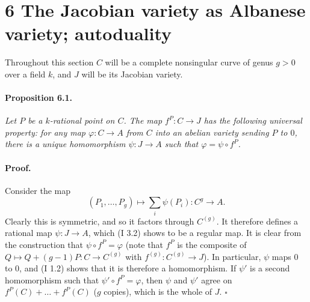 

\DeclareMathOperator{\Hom}{Hom}
\DeclareMathOperator{\Gal}{Gal}

\section*{6 \quad The Jacobian variety as Albanese variety; autoduality}

Throughout this section $C$ will be a complete nonsingular curve of genus
$g > 0$ over a field $k$, and $J$ will be its Jacobian variety.

\paragraph{Proposition 6.1.}
\textit{Let $P$ be a $k$-rational point on $C$. The map
$f^P \colon C \to J$ has the following universal property: for any map
$\varphi \colon C \to A$ from $C$ into an abelian variety sending $P$ to $0$,
there is a unique homomorphism $\psi \colon J \to A$ such that
$\varphi = \psi \circ f^P$.}

\paragraph{Proof.}
Consider the map
\[
  (P_1, \dots, P_g) \mapsto \sum_i \psi(P_i) \colon C^g \to A.
\]
Clearly this is symmetric, and so it factors through $C^{(g)}$. It therefore
defines a rational map $\psi \colon J \to A$, which (I 3.2) shows to be a
regular map. It is clear from the construction that $\psi \circ f^P = \varphi$
(note that $f^P$ is the composite of
$Q \mapsto Q + (g-1)P \colon C \to C^{(g)}$ with
$f^{(g)} \colon C^{(g)} \to J$). In particular, $\psi$ maps $0$ to $0$, and
(I 1.2) shows that it is therefore a homomorphism. If $\psi'$ is a second
homomorphism such that $\psi' \circ f^P = \varphi$, then $\psi$ and $\psi'$
agree on $f^P(C) + \dots + f^P(C)$ ($g$ copies), which is the whole of $J$.
\hfill $\square$

